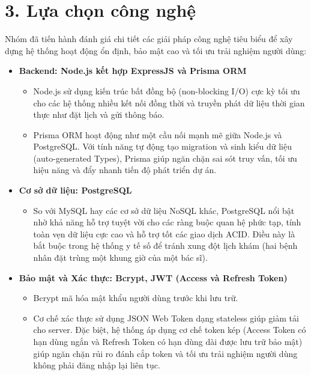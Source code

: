 \documentclass[12pt,a4paper]{report}
\begin{document}
\section*{3. Lựa chọn công nghệ}
\hspace{1em} Nhóm đã tiến hành đánh giá chi tiết các giải pháp công nghệ tiêu biểu để xây dựng hệ thống hoạt động ổn định, bảo mật cao và tối ưu trải nghiệm người dùng:
\begin{itemize}
\item \textbf{Backend: Node.js kết hợp ExpressJS và Prisma ORM}
\begin{itemize}
    \item Node.js sử dụng kiến trúc bất đồng bộ (non-blocking I/O) cực kỳ tối ưu cho các hệ thống nhiều kết nối đồng thời và truyền phát dữ liệu thời gian thực như đặt lịch và gửi thông báo.
    \item Prisma ORM hoạt động như một cầu nối mạnh mẽ giữa Node.js và PostgreSQL. Với tính năng tự động tạo migration và sinh kiểu dữ liệu (auto-generated Types), Prisma giúp ngăn chặn sai sót truy vấn, tối ưu hiệu năng và đẩy nhanh tiến độ phát triển dự án.
\end{itemize}

\item \textbf{Cơ sở dữ liệu: PostgreSQL}
\begin{itemize}
    \item So với MySQL hay các cơ sở dữ liệu NoSQL khác, PostgreSQL nổi bật nhờ khả năng hỗ trợ tuyệt vời cho các ràng buộc quan hệ phức tạp, tính toàn vẹn dữ liệu cực cao và hỗ trợ tốt các giao dịch ACID. Điều này là bắt buộc trong hệ thống y tế số để tránh xung đột lịch khám (hai bệnh nhân đặt trùng một khung giờ của một bác sĩ).
\end{itemize}

\item \textbf{Bảo mật và Xác thực: Bcrypt, JWT (Access và Refresh Token)}
\begin{itemize}
    \item Bcrypt mã hóa mật khẩu người dùng trước khi lưu trữ.
    \item Cơ chế xác thực sử dụng JSON Web Token dạng stateless giúp giảm tải cho server. Đặc biệt, hệ thống áp dụng cơ chế token kép (Access Token có hạn dùng ngắn và Refresh Token có hạn dùng dài được lưu trữ bảo mật) giúp ngăn chặn rủi ro đánh cắp token và tối ưu trải nghiệm người dùng không phải đăng nhập lại liên tục.
\end{itemize}


\end{itemize}
\end{document}
